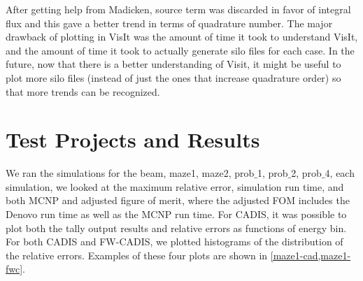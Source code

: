 \documentclass[10pt]{article}
\begin{document}
After getting help from Madicken, source term was discarded in favor of integral flux and this gave a better trend in terms of quadrature number.
The major drawback of plotting in VisIt was the amount of time it took to understand VisIt, and the amount of time it took to actually generate silo files for each case.
In the future, now that there is a better understanding of Visit, it might be useful to plot more silo files (instead of just the ones that increase quadrature order) so that more trends can be recognized.

\newpage

\section{Test Projects and Results}
\label{sec:test}

We ran the simulations for the beam, maze1, maze2, prob$\_$1, prob$\_$2, prob$\_$4, each simulation, we looked at the maximum relative error, simulation run time, and both MCNP and adjusted figure of merit, where the adjusted FOM includes the Denovo run time as well as the MCNP run time.
For CADIS, it was possible to plot both the tally output results and relative errors as functions of energy bin.
For both CADIS and FW-CADIS, we plotted histograms of the distribution of the relative errors.
Examples of these four plots are shown in \cref{maze1-cad,maze1-fwc}.
\end{document}
